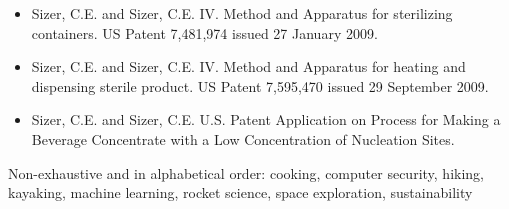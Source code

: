 \documentclass[10pt,a4paper]{article} %
\begin{document}

\spacedhrule{1.6em}{-0.4em} %



\begin{itemize}
\item[] Sizer, C.E.  and Sizer, C.E. IV.  Method and Apparatus for sterilizing containers.   US Patent 7,481,974 issued 27 January 2009.
\item[] Sizer, C.E. and Sizer, C.E. IV.   Method and Apparatus for heating and dispensing sterile product.   US Patent 7,595,470 issued 29 September 2009.
\item[] Sizer, C.E. and Sizer, C.E. U.S. Patent Application on Process for Making a Beverage Concentrate with a Low Concentration of Nucleation Sites.
\end{itemize}




\inlineheadsection %
{Non-exhaustive and in alphabetical order:}
{cooking, computer security, hiking, kayaking, machine learning,  rocket science, space exploration, sustainability}
\end{document}
